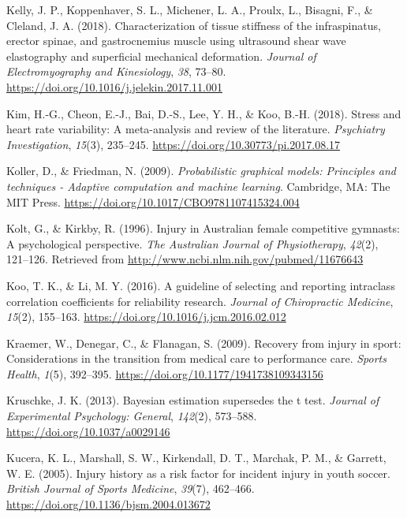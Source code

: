 \documentclass[
  english,
  man,floatsintext]{apa6}
\begin{document}
\leavevmode\hypertarget{ref-Kelly2018}{}%
Kelly, J. P., Koppenhaver, S. L., Michener, L. A., Proulx, L., Bisagni, F., \& Cleland, J. A. (2018). Characterization of tissue stiffness of the infraspinatus, erector spinae, and gastrocnemius muscle using ultrasound shear wave elastography and superficial mechanical deformation. \emph{Journal of Electromyography and Kinesiology}, \emph{38}, 73--80. \url{https://doi.org/10.1016/j.jelekin.2017.11.001}

\leavevmode\hypertarget{ref-Kim2018}{}%
Kim, H.-G., Cheon, E.-J., Bai, D.-S., Lee, Y. H., \& Koo, B.-H. (2018). Stress and heart rate variability: A meta-analysis and review of the literature. \emph{Psychiatry Investigation}, \emph{15}(3), 235--245. \url{https://doi.org/10.30773/pi.2017.08.17}

\leavevmode\hypertarget{ref-Koller2009}{}%
Koller, D., \& Friedman, N. (2009). \emph{Probabilistic graphical models: Principles and techniques - Adaptive computation and machine learning}. Cambridge, MA: The MIT Press. \url{https://doi.org/10.1017/CBO9781107415324.004}

\leavevmode\hypertarget{ref-Kolt1996}{}%
Kolt, G., \& Kirkby, R. (1996). Injury in Australian female competitive gymnasts: A psychological perspective. \emph{The Australian Journal of Physiotherapy}, \emph{42}(2), 121--126. Retrieved from \url{http://www.ncbi.nlm.nih.gov/pubmed/11676643}

\leavevmode\hypertarget{ref-Koo2016}{}%
Koo, T. K., \& Li, M. Y. (2016). A guideline of selecting and reporting intraclass correlation coefficients for reliability research. \emph{Journal of Chiropractic Medicine}, \emph{15}(2), 155--163. \url{https://doi.org/10.1016/j.jcm.2016.02.012}

\leavevmode\hypertarget{ref-Kraemer2009}{}%
Kraemer, W., Denegar, C., \& Flanagan, S. (2009). Recovery from injury in sport: Considerations in the transition from medical care to performance care. \emph{Sports Health}, \emph{1}(5), 392--395. \url{https://doi.org/10.1177/1941738109343156}

\leavevmode\hypertarget{ref-Kruschke2013}{}%
Kruschke, J. K. (2013). Bayesian estimation supersedes the t test. \emph{Journal of Experimental Psychology: General}, \emph{142}(2), 573--588. \url{https://doi.org/10.1037/a0029146}

\leavevmode\hypertarget{ref-Kucera2005}{}%
Kucera, K. L., Marshall, S. W., Kirkendall, D. T., Marchak, P. M., \& Garrett, W. E. (2005). Injury history as a risk factor for incident injury in youth soccer. \emph{British Journal of Sports Medicine}, \emph{39}(7), 462--466. \url{https://doi.org/10.1136/bjsm.2004.013672}
\end{document}
